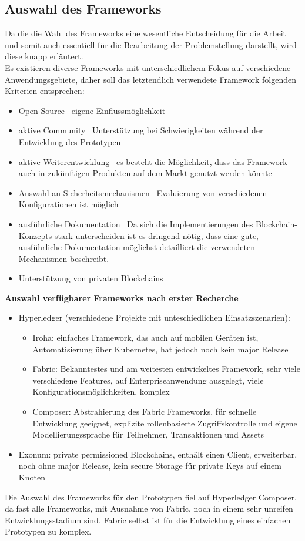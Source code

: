 \subsection{Auswahl des Frameworks}
\label{sec:prototype_framework}
    Da die die Wahl des Frameworks eine wesentliche Entscheidung für die Arbeit und somit auch essentiell für die Bearbeitung der Problemstellung darstellt, wird diese knapp erläutert.
    \medskip\\
    Es existieren diverse Frameworks mit unterschiedlichem Fokus auf verschiedene Anwendungsgebiete, daher soll das letztendlich verwendete Framework folgenden Kriterien entsprechen:
    \begin{itemize}[noitemsep]
        \item Open Source \textrightarrow\ eigene Einflussmöglichkeit
        \item aktive Community \textrightarrow\ Unterstützung bei Schwierigkeiten während der Entwicklung des Prototypen
        \item aktive Weiterentwicklung \textrightarrow\ es besteht die Möglichkeit, dass das Framework auch in zukünftigen Produkten auf dem Markt genutzt werden könnte
        \item Auswahl an Sicherheitsmechanismen \textrightarrow\ Evaluierung von verschiedenen Konfigurationen ist möglich
        \item ausführliche Dokumentation \textrightarrow\ Da sich die Implementierungen des Blockchain-Konzepts stark unterscheiden ist es dringend nötig, dass eine gute, ausführliche Dokumentation möglichst detailliert die verwendeten Mechanismen beschreibt.
        \item Unterstützung von privaten Blockchains
    \end{itemize}
    \medskip
    \textbf{Auswahl verfügbarer Frameworks nach erster Recherche}
    \begin{itemize}[noitemsep]
        \item Hyperledger (verschiedene Projekte mit unteschiedlichen Einsatzszenarien):
            \begin{itemize}[noitemsep]
                \item Iroha: einfaches Framework, das auch auf mobilen Geräten ist, Automatisierung über Kubernetes, hat jedoch noch kein major Release
                \item Fabric: Bekanntestes und am weitesten entwickeltes Framework, sehr viele verschiedene Features, auf Enterpriseanwendung ausgelegt, viele Konfigurationsmöglichkeiten, komplex
                \item Composer: Abstrahierung des Fabric Frameworks, für schnelle Entwicklung geeignet, explizite rollenbasierte Zugriffskontrolle und eigene Modellierungssprache für Teilnehmer, Transaktionen und Assets
            \end{itemize}
        \item Exonum: private permissioned Blockchains, enthält einen Client, erweiterbar, noch ohne major Release, kein secure Storage für private Keys auf einem Knoten
    \end{itemize}
    Die Auswahl des Frameworks für den Prototypen fiel auf Hyperledger Composer, da fast alle Frameworks, mit Ausnahme von Fabric, noch in einem sehr unreifen Entwicklungsstadium sind.
    Fabric selbst ist für die Entwicklung eines einfachen Prototypen zu komplex.
